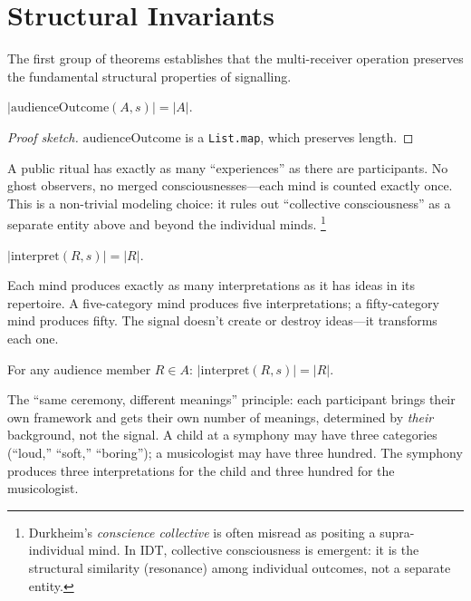 \section{Structural Invariants}
\label{sec:mr-structure}

The first group of theorems establishes that the multi-receiver operation
preserves the fundamental structural properties of signalling.

\begin{theorem}
\label{thm:audience-size}
$|\mathrm{audienceOutcome}(A, s)| = |A|.$
\end{theorem}

\begin{proof}[Proof sketch]
$\mathrm{audienceOutcome}$ is a \texttt{List.map}, which preserves length.
\end{proof}

A public ritual has exactly as many ``experiences'' as there are
participants.  No ghost observers, no merged consciousnesses---each mind
is counted exactly once.  This is a non-trivial modeling choice: it rules
out ``collective consciousness'' as a separate entity above and beyond the
individual minds.%
\footnote{Durkheim's \emph{conscience collective} is often misread as
positing a supra-individual mind.  In IDT, collective consciousness is
emergent: it is the structural similarity (resonance) among individual
outcomes, not a separate entity.}

\begin{theorem}
\label{thm:per-receiver-count}
$|\mathrm{interpret}(R, s)| = |R|.$
\end{theorem}

Each mind produces exactly as many interpretations as it has ideas in its
repertoire.  A five-category mind produces five interpretations; a
fifty-category mind produces fifty.  The signal doesn't create or destroy
ideas---it transforms each one.

\begin{theorem}
\label{thm:same-signal-different}
For any audience member $R\in A$:
$|\mathrm{interpret}(R, s)| = |R|.$
\end{theorem}

The ``same ceremony, different meanings'' principle: each participant brings
their own framework and gets their own number of meanings, determined by
\emph{their} background, not the signal.  A child at a symphony may have
three categories (``loud,'' ``soft,'' ``boring''); a musicologist may have
three hundred.  The symphony produces three interpretations for the child
and three hundred for the musicologist.


